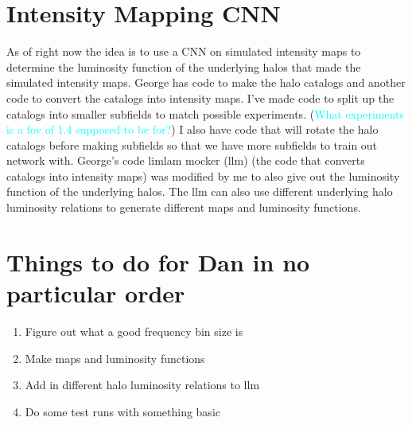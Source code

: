 \documentclass{article}
\newcommand{\dnp}[1]{\textcolor{cyan}{#1}}
\begin{document}
	\section{Intensity Mapping CNN} \label{sec:cnn}

		As of right now the idea is to use a CNN on simulated intensity maps to determine the luminosity function of the underlying halos that made the simulated intensity maps.  George has code to make the halo catalogs and another code to convert the catalogs into intensity maps.  I've made code to split up the catalogs into smaller subfields to match possible experiments. (\dnp{What experiments is a fov of 1.4 supposed to be for?})  I also have code that will rotate the halo catalogs before making subfields so that we have more subfields to train out network with.  George's code limlam mocker (llm) (the code that converts catalogs into intensity maps) was modified by me to also give out the luminosity function of the underlying halos.  The llm can also use different underlying halo luminosity relations to generate different maps and luminosity functions.

	\section{Things to do for Dan in no particular order}
		\begin{enumerate}
			\item Figure out what a good frequency bin size is

			\item Make maps and luminosity functions

			\item Add in different halo luminosity relations to llm

			\item Do some test runs with something basic
		\end{enumerate}


	
% 
\end{document}
